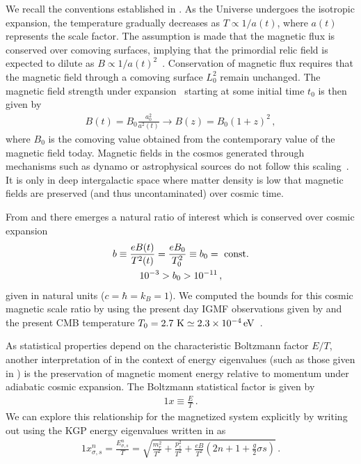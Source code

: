 We recall the conventions established in . As the Universe undergoes the isotropic expansion, the temperature gradually decreases as $T\propto1/a(t)$, where $a(t)$ represents the scale factor. The assumption is made that the magnetic flux is conserved over comoving surfaces, implying that the primordial relic field is expected to dilute as $B\propto1/a(t)^{2}$~\cite{Rafelski:2023emw}. Conservation of magnetic flux requires that the magnetic field through a comoving surface $L_{0}^{2}$ remain unchanged. The magnetic field strength under expansion~\cite{Durrer:2013pga} starting at some initial time $t_{0}$ is then given by
\begin{gather}
 \label{bscale}
 B(t)=B_{0}\frac{a^{2}_{0}}{a^{2}(t)}\rightarrow B(z)=B_{0}\left(1+z\right)^{2}\,,
\end{gather}
where $B_{0}$ is the comoving value obtained from the contemporary value of the magnetic field today. Magnetic fields in the cosmos generated through mechanisms such as dynamo or astrophysical sources do not follow this scaling~\cite{Pomakov:2022cem}. It is only in deep intergalactic space where matter density is low that magnetic fields are preserved (and thus uncontaminated) over cosmic time.

From  and  there emerges a natural ratio of interest which is conserved over cosmic expansion 
\begin{gather}
 \label{tbscale}
 b\equiv\frac{e{B}(t)}{T^{2}(t)}=\frac{e{B}_{0}}{T_{0}^{2}}\equiv b_0={\rm\ const.}\\
 10^{-3}>b_{0}>10^{-11}\,,
\end{gather}
given in natural units ($c=\hbar=k_{B}=1$). We computed the bounds for this cosmic magnetic scale ratio by using the present day IGMF observations given by  and the present CMB temperature $T_{0}=2.7{\rm\ K}\simeq2.3\times10^{-4}\eV$~\cite{Planck:2018vyg}.

\label{sec:protection}
As statistical properties depend on the characteristic Boltzmann factor $E/T$, another interpretation of  in the context of energy eigenvalues (such as those given in ) is the preservation of magnetic moment energy relative to momentum under adiabatic cosmic expansion. The Boltzmann statistical factor is given by
\begin{alignat}{1}
 \label{Boltz} x\equiv\frac{E}{T}\,.
\end{alignat}
We can explore this relationship for the magnetized system explicitly by writing out  using the KGP energy eigenvalues written in  as
\begin{alignat}{1}
 \label{XExplicit} x_{\sigma,s}^{n} = \frac{E_{\sigma,s}^{n}}{T} = \sqrt{\frac{m_{e}^{2}}{T^{2}}+\frac{p_{z}^{2}}{T^{2}}+\frac{eB}{T^{2}}\left(2n+1+\frac{g}{2}\sigma s\right)}\,.
\end{alignat}

